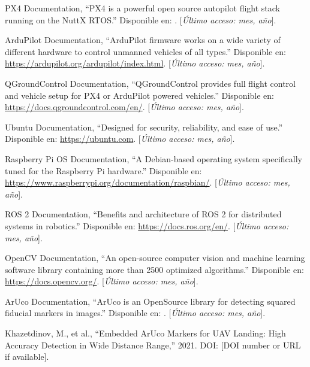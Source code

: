 \begin{thebibliography}{9}

     PX4 Documentation, ``PX4 is a powerful open source autopilot flight stack running on the NuttX RTOS.'' Disponible en: \url{}. [\textit{Último acceso: mes, año}].

     ArduPilot Documentation, ``ArduPilot firmware works on a wide variety of different hardware to control unmanned vehicles of all types.'' Disponible en: \url{https://ardupilot.org/ardupilot/index.html}. [\textit{Último acceso: mes, año}].

     QGroundControl Documentation, ``QGroundControl provides full flight control and vehicle setup for PX4 or ArduPilot powered vehicles.'' Disponible en: \url{https://docs.qgroundcontrol.com/en/}. [\textit{Último acceso: mes, año}].

     Ubuntu Documentation, ``Designed for security, reliability, and ease of use.'' Disponible en: \url{https://ubuntu.com}. [\textit{Último acceso: mes, año}].

     Raspberry Pi OS Documentation, ``A Debian-based operating system specifically tuned for the Raspberry Pi hardware.'' Disponible en: \url{https://www.raspberrypi.org/documentation/raspbian/}. [\textit{Último acceso: mes, año}].

     ROS 2 Documentation, ``Benefits and architecture of ROS 2 for distributed systems in robotics.'' Disponible en: \url{https://docs.ros.org/en/}. [\textit{Último acceso: mes, año}].

     OpenCV Documentation, ``An open-source computer vision and machine learning software library containing more than 2500 optimized algorithms.'' Disponible en: \url{https://docs.opencv.org/}. [\textit{Último acceso: mes, año}].

     ArUco Documentation, ``ArUco is an OpenSource library for detecting squared fiducial markers in images.'' Disponible en: \url{}. [\textit{Último acceso: mes, año}].

     Khazetdinov, M., et al., ``Embedded ArUco Markers for UAV Landing: High Accuracy Detection in Wide Distance Range,'' 2021. DOI: [DOI number or URL if available].

\end{thebibliography}
